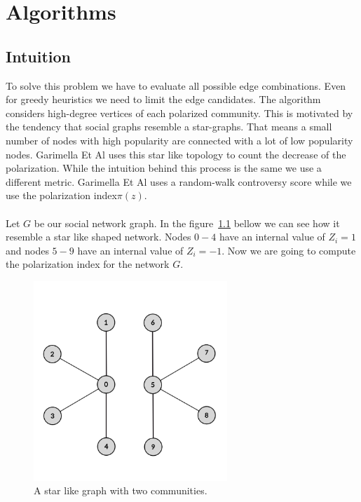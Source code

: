 \chapter{Algorithms}
\label{ch:algorithms}



\section{Intuition}
\label{sec:intuition}

To solve this problem we have to evaluate all possible edge combinations. Even for greedy heuristics we need to limit the edge candidates. The algorithm considers high-degree vertices of each polarized community. This is motivated by the tendency that social graphs resemble a star-graphs. That means a small number of nodes with high popularity are connected with a lot of low popularity nodes. Garimella Et Al \cite{garimella} uses this star like topology to count the decrease of the polarization. While the intuition behind this process is the same we use a different metric. Garimella Et Al uses a random-walk controversy score while we use the polarization index$\pi(z)$.
\\
\\
Let $G$ be our social network graph. In the figure~\ref{fig:starA} bellow we can see how it resemble a star like shaped network. Nodes $0-4$ have an internal value of $Z_i = 1$ and nodes $5-9$ have an internal value of $Z_i=-1$. Now we are going to compute the polarization index for the network $G$. 
\\

\begin{figure}[t]
	\centering
	\includegraphics[width=0.65\textwidth]{Figures/starA}
	\caption{A star like graph with two communities.}
	\label{fig:starA}
\end{figure}

